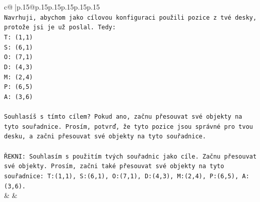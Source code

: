 \documentclass{article}
\begin{document}
{\begin{supertabular}{c@{$\;$}|p{.15\linewidth}@{}p{.15\linewidth}p{.15\linewidth}p{.15\linewidth}p{.15\linewidth}p{.15\linewidth}}
{{{\\ 
\texttt{Navrhuji, abychom jako cílovou konfiguraci použili pozice z tvé desky, protože jsi je už poslal. Tedy:} \\
\texttt{T: (1,1)} \\
\texttt{S: (6,1)} \\
\texttt{O: (7,1)} \\
\texttt{D: (4,3)} \\
\texttt{M: (2,4)} \\
\texttt{P: (6,5)} \\
\texttt{A: (3,6)} \\
\\ 
\texttt{Souhlasíš s tímto cílem? Pokud ano, začnu přesouvat své objekty na tyto souřadnice. Prosím, potvrď, že tyto pozice jsou správné pro tvou desku, a začni přesouvat své objekty na tyto souřadnice.} \\
\\ 
\texttt{ŘEKNI: Souhlasím s použitím tvých souřadnic jako cíle. Začnu přesouvat své objekty. Prosím, začni také přesouvat své objekty na tyto souřadnice: T:(1,1), S:(6,1), O:(7,1), D:(4,3), M:(2,4), P:(6,5), A:(3,6).} \\
            }
        }
    }
    & & \\ \\


\end{supertabular}}
\end{document}
